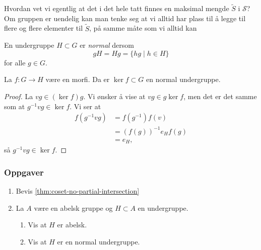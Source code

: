\begin{remark}
    Hvordan vet vi egentlig at det i det hele tatt finnes en maksimal
    mengde $\tilde S$ i $\mathscr S$?
    Om gruppen er uendelig kan man tenke seg at vi alltid
    har plass til å legge til flere og flere elementer til $\tilde S$,
    på samme måte som vi alltid kan
\end{remark}

\begin{definition}
    En undergruppe $H\subset G$ er \textit{normal}
    dersom
    \[
        gH = Hg = \{hg\mid h\in H\}
    \]
    for alle $g\in G$.
\end{definition}

\begin{lemma}
    La $f\colon G\to H$ være en morfi.
    Da er $\ker f\subset G$ en normal undergruppe.
\end{lemma}
\begin{proof}
    La $vg\in(\ker f) g$.
    Vi ønsker å vise at $vg\in g\ker f$,
    men det er det samme som at $g^{-1} vg\in \ker f$.
    Vi ser at
    \[\begin{aligned}
        f(g^{-1}vg)
        &= f(g^{-1})f(v)
        \\
        &= {(f(g))}^{-1} e_H f(g)
        \\
        &= e_H,
    \end{aligned}\]
    så $g^{-1} vg\in \ker f$.
\end{proof}

\subsubsection*{Oppgaver}

\begin{enumerate}
    \item Bevis \cref{thm:coset-no-partial-intersection}
    \item La $A$ være en abelsk gruppe og $H\subset A$ en undergruppe.
        \begin{enumerate}
            \item Vis at $H$ er abelsk.
            \item Vis at $H$ er en normal undergruppe.
        \end{enumerate}
\end{enumerate}

